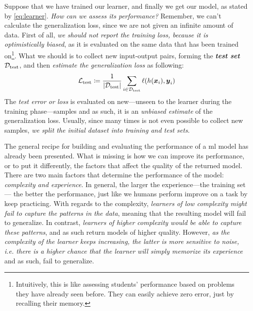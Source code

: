 Suppose that we have trained our learner, and finally we get our model, as
stated by \Equation{} \ref{eq:learner}. \emph{How can we assess its
performance?} Remember, we can't calculate the generalization
loss, since we are not given an infinite amount of
data. First of all, \emph{we should not report the training loss, because it is optimistically biased}, as it
is evaluated on the same data that has been trained on\footnote{Intuitively,
this is like assessing students' performance based on problems they have already
seen before. They can easily achieve zero error, just by recalling their
memory.}. What we should is to collect new input-output pairs, forming the
\emph{\textbf{test set}} $\mathcal{D}_\text{test}$, and then \emph{estimate the
generalization loss} as following:
\begin{equation}
	\label{eq:test_loss}
	\mathcal{L}_\text{test} \coloneqq \frac{1}{\lvert \mathcal{D}_\text{test} \rvert} \sum_{i \in \mathcal{D}_\text{test}}
	\ell(h(\boldsymbol{x}_i), \boldsymbol{y}_i)
\end{equation}
The \emph{test error or loss} is evaluated on
new---unseen to the learner during the training phase---samples and as such, it is an \emph{unbiased estimate} of the generalization loss. Usually, since many times is not even
possible to collect new samples, \emph{we split the initial
dataset into training and test sets}.

The general recipe for building and evaluating the performance of a \gls{ml}
model has already been presented. What is missing is how we can improve its
performance, or to put it differently, the factors that affect the quality of
the returned model. There are two main factors that determine the performance of
the model: \emph{complexity and experience}.
In general, the larger the experience---the training set---
the better the performance, just like we humans perform improve on a task by
keep practicing. With regards to the complexity, \emph{learners of low
complexity might fail to capture the patterns in the
data}, meaning that the resulting model will fail to generalize. In contrast,
\emph{learners of higher complexity would be able to capture these patterns},
and as such return models of higher quality. However, \emph{as the complexity of
the learner keeps increasing, the latter is more sensitive to noise, i.e. there
is a higher chance that the learner will simply memorize its experience} and as
such, fail to generalize.

